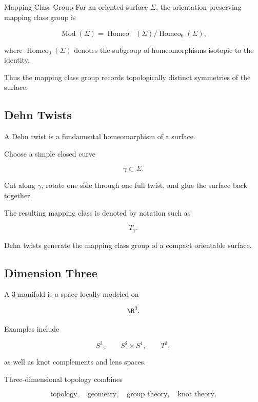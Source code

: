 \begin{definitionbox}{Mapping Class Group}
For an oriented surface \(\Sigma\), the orientation-preserving mapping class
group is

\[
\boxed{
\operatorname{Mod}(\Sigma)
=
\operatorname{Homeo}^{+}(\Sigma)
/
\operatorname{Homeo}_{0}(\Sigma),
}
\]

where \(\operatorname{Homeo}_{0}(\Sigma)\) denotes the subgroup of
homeomorphisms isotopic to the identity.
\end{definitionbox}

Thus the mapping class group records topologically distinct symmetries of
the surface.

\subsection{Dehn Twists}
\label{subsec:dehn-twists}

A Dehn twist is a fundamental homeomorphism of a surface.

Choose a simple closed curve

\[
\gamma\subset\Sigma.
\]

Cut along \(\gamma\), rotate one side through one full twist, and glue the
surface back together.

The resulting mapping class is denoted by notation such as

\[
\boxed{
T_\gamma.
}
\]

Dehn twists generate the mapping class group of a compact orientable
surface.

\subsection{Dimension Three}
\label{subsec:dimension-three-topology}

A \(3\)-manifold is a space locally modeled on

\[
\R^3.
\]

Examples include

\[
\boxed{
S^3,
\qquad
S^2\times S^1,
\qquad
T^3,
}
\]

as well as knot complements and lens spaces.

Three-dimensional topology combines

\[
\boxed{
\text{topology},
\quad
\text{geometry},
\quad
\text{group theory},
\quad
\text{knot theory}.
}
\]

